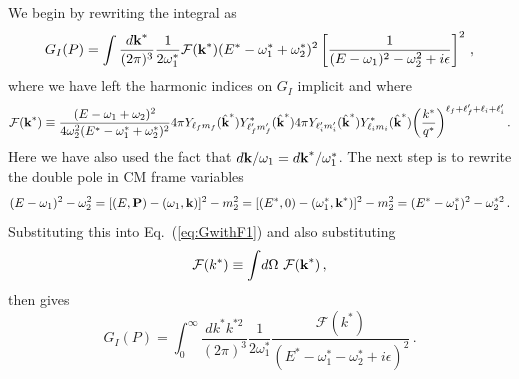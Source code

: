 We begin by rewriting the integral as 
\begin{equation}
\label{eq:GwithF1}
G_{I}(P)  = 
\int \frac{d \textbf k^*}{(2 \pi)^3} \frac{1}{2 \omega_{1}^*}
\mathcal F(\textbf k^*) (E^* - \omega_1^* + \omega_2^*)^2 \left[  \frac{1}{(E  -  \omega_{1})^2 - \omega_{2}^2 +    i\epsilon}\right ]^2
  \,,
\end{equation}
where we have left the harmonic indices on $G_I$ implicit and where
\begin{equation}
 \mathcal F(\textbf k^*) \equiv  \frac{(E -  \omega_{1} + \omega_{2}  )^2}{4 \omega_{2}^2 (E^* - \omega_1^* + \omega_2^*)^2} 4 \pi  Y_{\ell_fm_{ f}}(\hat {\textbf k}^* )
Y^*_{\ell_f'm_{f}'}(\hat {\textbf k}^* ) 4 \pi  Y_{\ell_i' m_{i}'}(\hat {\textbf k}^* )
Y^*_{\ell_i m_{i}}(\hat {\textbf k}^* )   \bigg (\frac{k^{*} }{q^* } \bigg)^{\ell_f+\ell_f'+\ell_i+\ell_i'}\,.
\end{equation}
Here we have also used the fact that ${d \textbf k}/{\omega_{1}}={d \textbf k^*}/{\omega_{1}^*}$. The next step is to rewrite the double pole in CM frame variables
\begin{equation}
\label{eq:ipolesub}
(E -  \omega_{1})^2 - \omega_{2}^2 = [(E, \textbf P) - (\omega_{1}, \textbf k)]^2 - m_{2}^2 = [(E^*, 0) - (\omega_{1}^*, \textbf k^* )]^2 - m_{2}^2 = (E^* - \omega_{1}^*)^2 - \omega_{2}^{*2} \,.
\end{equation}
Substituting this into Eq.~(\ref{eq:GwithF1}) and also substituting
\begin{equation}
\mathcal F(k^*) \equiv \int \! d \Omega\ \mathcal F(\textbf k^*) \,,
\end{equation}
then gives
\begin{equation}
G_{I}(P)  = 
\int_{0}^\infty \frac{d k^* k^{*2}}{(2 \pi)^3} \frac{1}{2 \omega_{1}^*}
 \frac{\mathcal F( k^*)}{(E^*  -  \omega_{1}^* - \omega_{2}^* +    i\epsilon)^2}
  \,.
\end{equation}

